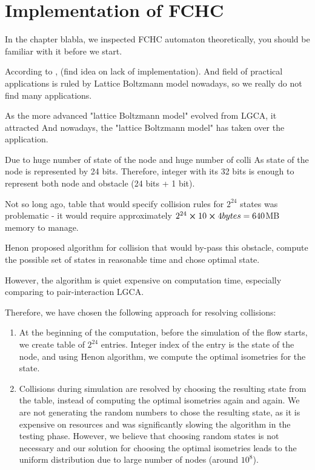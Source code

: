 \chapter{Implementation of FCHC}

In the chapter blabla, we inspected FCHC automaton theoretically, you should be familiar with it before we start.

According to \cite{Wolf}, (find idea on lack of implementation).
And field of practical applications is ruled by Lattice Boltzmann model nowadays, so we really do not find many applications.

As the more advanced "lattice Boltzmann model" evolved from LGCA, it attracted 
And nowadays, the "lattice Boltzmann model" has taken over the application.

Due to huge number of state of the node and huge number of colli
As state of the node is represented by 24 bits.
Therefore, integer with its 32 bits is enough to represent both node and obstacle (24 bits + 1 bit).

\bigskip

Not so long ago, table that would specify collision rules for $2^{24}$ states was problematic - it would require approximately $2^{24} \cross 10 \cross 4 bytes = 640$MB memory to manage.

Henon proposed algorithm for collision that would by-pass this obstacle, compute the possible set of states in reasonable time and chose optimal state.

However, the algorithm is quiet expensive on computation time, especially comparing to pair-interaction LGCA.

Therefore, we have chosen the following approach for resolving collisions:
\begin{enumerate}
\item At the beginning of the computation, before the simulation of the flow starts, we create table of $2^{24}$ entries. Integer index of the entry is the state of the node, and using Henon algorithm, we compute the optimal isometries for the state.
\item Collisions during simulation are resolved by choosing the resulting state from the table, instead of computing the optimal isometries again and again. We are not generating the random numbers to chose the resulting state, as it is expensive on resources and was significantly slowing the algorithm in the testing phase. However, we believe that choosing random states is not necessary and our solution for choosing the optimal isometries leads to the uniform distribution due to large number of nodes (around $10^{8}$).

\end{enumerate}

